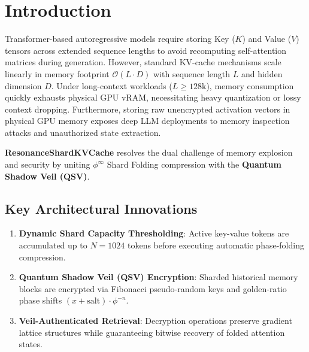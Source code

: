\section{Introduction}
Transformer-based autoregressive models require storing Key ($K$) and Value ($V$) tensors across extended sequence lengths to avoid recomputing self-attention matrices during generation. However, standard KV-cache mechanisms scale linearly in memory footprint $\mathcal{O}(L \cdot D)$ with sequence length $L$ and hidden dimension $D$. Under long-context workloads ($L \ge 128\text{k}$), memory consumption quickly exhausts physical GPU vRAM, necessitating heavy quantization or lossy context dropping. Furthermore, storing raw unencrypted activation vectors in physical GPU memory exposes deep LLM deployments to memory inspection attacks and unauthorized state extraction.

\textbf{ResonanceShardKVCache} resolves the dual challenge of memory explosion and security by uniting $\phi^\infty$ Shard Folding compression with the \textbf{Quantum Shadow Veil (QSV)}.

\subsection{Key Architectural Innovations}
\begin{enumerate}[label=\textbf{\arabic*.}]
    \item \textbf{Dynamic Shard Capacity Thresholding}: Active key-value tokens are accumulated up to $N = 1024$ tokens before executing automatic phase-folding compression.
    \item \textbf{Quantum Shadow Veil (QSV) Encryption}: Sharded historical memory blocks are encrypted via Fibonacci pseudo-random keys and golden-ratio phase shifts $(x + \text{salt}) \cdot \phi^{-n}$.
    \item \textbf{Veil-Authenticated Retrieval}: Decryption operations preserve gradient lattice structures while guaranteeing bitwise recovery of folded attention states.
\end{enumerate}
